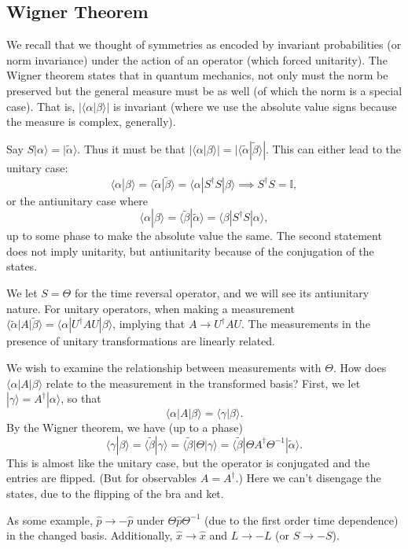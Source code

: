 \documentclass[fontsize=12pt]{scrartcl}
\newcommand{\bb}[1]{\mathbb{#1}}
\newcommand{\Id}{\bb{I}}
\newcommand{\la}{\langle}
\newcommand{\ra}{\rangle}
\newcommand{\pos}{\hat{x}}
\newcommand{\mom}{\hat{p}}
\begin{document}
\subsection{Wigner Theorem}

We recall that we thought of symmetries as encoded by invariant probabilities (or norm invariance) under the action of an operator (which forced unitarity). The Wigner theorem states that in quantum mechanics, not only must the norm be preserved but the general measure must be as well (of which the norm is a special case). That is, $|\la \alpha|\beta\ra|$ is invariant (where we use the absolute value signs because the measure is complex, generally).

Say $S|\alpha\ra = |\tilde{\alpha}\ra$. Thus it must be that $|\la \alpha|\beta\ra|=|\la \tilde{\alpha}|\tilde{\beta}\ra |$. This can either lead to the unitary case: $$\la \alpha|\beta\ra = \la \tilde{\alpha}|\tilde{\beta}\ra = \la \alpha|S^\dagger S|\beta\ra\implies S^\dagger S=\Id,$$ or the antiunitary case where $$\la \alpha|\beta\ra = \la \tilde{\beta}|\tilde{\alpha}\ra=\la\beta|S^\dagger S|\alpha\ra,$$ up to some phase to make the absolute value the same. The second statement does not imply unitarity, but antiunitarity because of the conjugation of the states.

We let $S=\Theta$ for the time reversal operator, and we will see its antiunitary nature. For unitary operators, when making a measurement $\la \tilde{\alpha}|A|\tilde{\beta}\ra = \la \alpha|U^\dagger A U|\beta\ra$, implying that $A\to U^\dag AU$. The measurements in the presence of unitary transformations are linearly related.

We wish to examine the relationship between measurements with $\Theta$. How does $\la \alpha|A|\beta\ra$ relate to the measurement in the transformed basis? First, we let $|\gamma\ra = A^\dagger|\alpha\ra$, so that $$\la \alpha|A|\beta\ra = \la \gamma|\beta\ra.$$ By the Wigner theorem, we have (up to a phase) $$\la \gamma|\beta\ra = \la \tilde{\beta}|\gamma\ra=\la\tilde{\beta}|\Theta|\gamma\ra = \la\tilde{\beta}|\Theta A^\dag \Theta^{-1}|\tilde{\alpha}\ra.$$ This is almost like the unitary case, but the operator is conjugated and the entries are flipped. (But for observables $A=A^\dagger$.) Here we can't disengage the states, due to the flipping of the bra and ket.

As some example, $\mom\to -\mom$ under $\Theta\mom\Theta^{-1}$ (due to the first order time dependence) in the changed basis. Additionally, $\pos\to\pos$ and $L\to -L$ (or $S\to-S$).
\end{document}
